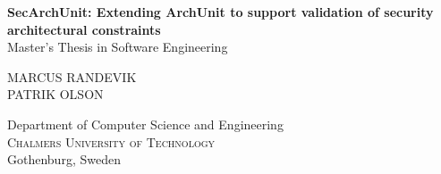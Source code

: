 
\begin{titlepage}
			
\addtolength{\voffset}{2cm}


\mbox{}
\vfill
\renewcommand{\familydefault}{\sfdefault} \normalfont %
\textbf{{\Huge 	SecArchUnit: Extending ArchUnit to
support validation of security architectural constraints}} 	\\[0.5cm]
Master's Thesis in Software Engineering \setlength{\parskip}{1cm}

{\Large MARCUS RANDEVIK \\[0.2cm]
        PATRIK OLSON} \setlength{\parskip}{2.9cm}

Department of Computer Science and Engineering \\
\textsc{Chalmers University of Technology} \\
Gothenburg, Sweden \the\year

\renewcommand{\familydefault}{\rmdefault} \normalfont %
\end{titlepage}


\newpage
\restoregeometry
\thispagestyle{empty}
\mbox{}


